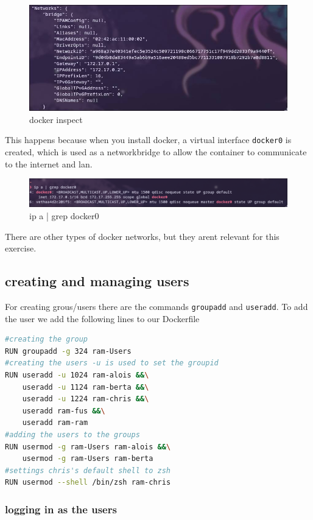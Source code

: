 \documentclass[a4paper]{article}
\begin{document}
\begin{figure}[h]
	\centering
	\includegraphics[scale=0.3]{images/docker_inspect_nw.png}
	\caption{docker inspect}
\end{figure}
This happens because when you install docker, a virtual interface \texttt{docker0} is created, which is used as a networkbridge to allow the container to communicate to the internet and lan. \cite{docker-networking-video}

\begin{figure}[h]
	\centering
	\includegraphics[scale=0.3]{images/ipadocker.png}
	\caption{ip a | grep docker0}
\end{figure}
There are other types of docker networks, but they arent relevant for this exercise.\cite{docker-networking-video}
\newpage
\subsection{creating and managing users}

For creating grous/users there are the commands \texttt{groupadd} and \texttt{useradd}.
To add the user we add the following lines to our Dockerfile
\begin{lstlisting}[language=bash]
#creating the group
RUN groupadd -g 324 ram-Users 
#creating the users -u is used to set the groupid
RUN useradd -u 1024 ram-alois &&\
    useradd -u 1124 ram-berta &&\
    useradd -u 1224 ram-chris &&\
    useradd ram-fus &&\
    useradd ram-ram
#adding the users to the groups
RUN usermod -g ram-Users ram-alois &&\
    usermod -g ram-Users ram-berta
#settings chris's default shell to zsh
RUN usermod --shell /bin/zsh ram-chris 
\end{lstlisting}
\subsubsection{logging in as the users}
\end{document}
